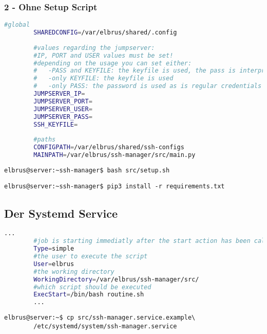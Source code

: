 \documentclass{article}
\begin{document}
	\subsubsection{2 - Ohne Setup Script}
	\lstset{style=files}
	\begin{lstlisting}[caption={Anhand von '.env.example' eigene '.env' Datei anlegen.}, language=bash]
		#global
		SHAREDCONFIG=/var/elbrus/shared/.config
		
		#values regarding the jumpserver:
		#IP, PORT and USER values must be set!
		#depending on the usage you can set either:
		#   -PASS and KEYFILE: the keyfile is used, the pass is interpreted as the passphrase
		#   -only KEYFILE: the keyfile is used
		#   -only PASS: the password is used as is regular credentials
		JUMPSERVER_IP=
		JUMPSERVER_PORT=
		JUMPSERVER_USER=
		JUMPSERVER_PASS=
		SSH_KEYFILE=
		
		#paths
		CONFIGPATH=/var/elbrus/shared/ssh-configs
		MAINPATH=/var/elbrus/ssh-manager/src/main.py
	\end{lstlisting}

	\lstset{style=commands}	
	\begin{lstlisting}[caption={Ausführen des Scripts zur Initialisierung des VCS Verzeichnisses.}]
		elbrus@server:~ssh-manager$ bash src/setup.sh
	\end{lstlisting}

	\begin{lstlisting}[caption={Installieren von fehlenden python3 Packages.}]
		elbrus@server:~ssh-manager$ pip3 install -r requirements.txt
	\end{lstlisting}
	
	\newpage
	\subsection[systemd service]{Der Systemd Service}
	\lstset{style=files}
	\begin{lstlisting}[caption={ssh-manager.service.example - Die Variable 'WorkingDirectory' sowie die Variable 'User' anpassen.},language=bash ,keywords={WorkingDirectory, User}, keywordstyle=\color{red}, firstnumber=5]
		...
		#job is starting immediatly after the start action has been called
		Type=simple
		#the user to execute the script
		User=elbrus
		#the working directory
		WorkingDirectory=/var/elbrus/ssh-manager/src/
		#which script should be executed
		ExecStart=/bin/bash routine.sh
		...
	\end{lstlisting}
	
	\lstset{style=commands}
	\begin{lstlisting}[caption={Kopieren des Serviceprogrammes.}]
		elbrus@server:~$ cp src/ssh-manager.service.example\
		/etc/systemd/system/ssh-manager.service
	\end{lstlisting}
\end{document}

